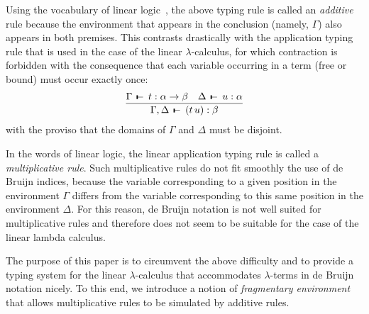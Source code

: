\documentclass[submission,creativecommons]{eptcs}
\def\joinrelm{\mathrel{\mkern-3mu}}
\def\relbar{\mathrel{\smash-}}
\def\tailpiece{\mathchoice
  {\vrule height 1ex width 0.3ex depth -.1ex}%
  {\vrule height 1ex width 0.3ex depth -.1ex}%
  {\vrule height 0.7ex width 0.3ex depth -.1ex}%
  {\vrule height 0.7ex width 0.3ex depth -.1ex}}
\def\seqsym{\mathrel{\tailpiece\joinrelm\relbar}}
\newcommand{\iapp}[2]{(#1\,#2)}
\newcommand{\tseq}[3]{#1 \, \seqsym \, #2 : #3}
\begin{document}
Using the vocabulary of linear logic~\cite{Girard:LL}, the above typing rule is called an \emph{additive}
rule because the environment that appears in the conclusion (namely, $\Gamma$) also appears in both premises.
This contrasts drastically with the application typing rule that is used in the case of the linear
$\lambda$-calculus, for which contraction is forbidden with the consequence that each variable occurring
in a term (free or bound) must occur exactly once:
\begin{align*}
\infer{
  \tseq{\Gamma,\Delta}{\iapp{t}{u}}{\beta}}{
  \tseq{\Gamma}{t}{\alpha \rightarrow \beta}
&
  \tseq{\Delta}{u}{\alpha}}
\end{align*}
with the proviso that the domains of $\Gamma$ and $\Delta$ must be disjoint.

In the words of linear logic, the linear application typing rule is called a \textit{multiplicative rule}.
Such multiplicative rules do not fit smoothly the use of de Bruijn indices, because the variable corresponding
to a given position in the environment $\Gamma$ differs from the variable corresponding to this same position
in the environment $\Delta$. For this reason, de Bruijn notation is not well suited for multiplicative rules
and therefore does not seem to be suitable for the case of the linear lambda calculus.

The purpose of this paper is to circumvent the above difficulty and to provide a typing system for the linear
$\lambda$-calculus that accommodates $\lambda$-terms in de Bruijn notation nicely. To this end, we introduce
a notion of \emph{fragmentary environment} that allows multiplicative rules to be simulated by additive rules.
\end{document}

